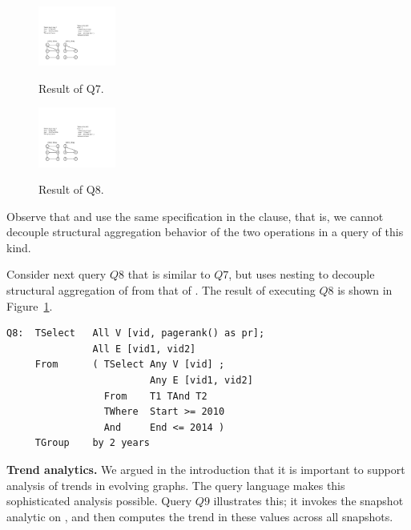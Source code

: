 \begin{figure}
\centering
\begin{minipage}{1.6in}
  \centering
  \includegraphics[width=1in]{figs/q7.pdf}
  \caption{Result of Q7.}{}
  \label{fig:q7}
\end{minipage}%
\begin{minipage}{1.6in}
  \centering
  \includegraphics[width=1in]{figs/q8.pdf}
  \caption{Result of Q8.}{}
  \label{fig:q8}
\end{minipage}
\end{figure}

Observe that  and  use the same
specification in the  clause, that is, we cannot
decouple structural aggregation behavior of the two operations in a
query of this kind.

Consider next query $Q8$ that is similar to $Q7$, but uses nesting to
decouple structural aggregation of  from that of
. The result of executing $Q8$ is shown in
Figure~\ref{fig:q8}.

\begin{small}
\begin{verbatim}
Q8:  TSelect   All V [vid, pagerank() as pr];
               All E [vid1, vid2]
     From      ( TSelect Any V [vid] ; 
                         Any E [vid1, vid2]
                 From    T1 TAnd T2
                 TWhere  Start >= 2010 
                 And     End <= 2014 )
     TGroup    by 2 years
\end{verbatim}
\end{small}

{\bf Trend analytics.} We argued in the introduction that it is
important to support analysis of trends in evolving graphs.  The \ql
query language makes this sophisticated analysis possible.  Query $Q9$
illustrates this; it invokes the snapshot analytic 
on , and then computes the trend in these values across all
snapshots.

